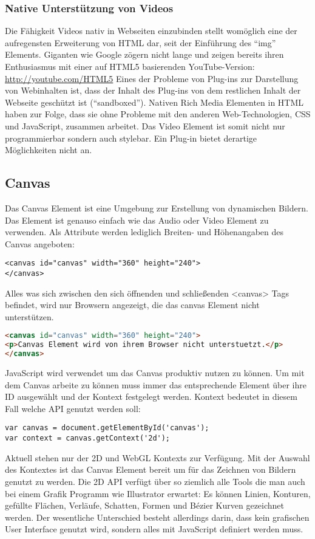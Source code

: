 \subsubsection{Native Unterstützung von Videos}
Die Fähigkeit Videos nativ in Webseiten einzubinden stellt womöglich eine der aufregensten Erweiterung
von HTML dar, seit der Einführung des ``img'' Elements. Giganten wie Google zögern nicht lange und
zeigen bereits ihren Enthusiasmus mit einer auf HTML5 basierenden YouTube-Version:
\url{http://youtube.com/HTML5}
Eines der Probleme von Plug-ins zur Darstellung von Webinhalten ist, dass der Inhalt des Plug-ins
von dem restlichen Inhalt der Webseite geschützt ist (``sandboxed''). Nativen Rich Media Elementen
in HTML haben zur Folge, dass sie ohne Probleme mit den anderen Web-Technologien,
CSS und JavaScript, zusammen arbeitet.
\newline\newline
Das Video Element ist somit nicht nur programmierbar sondern auch stylebar.
Ein Plug-in bietet derartige Möglichkeiten nicht an.

\subsection{Canvas}

Das Canvas Element ist eine Umgebung zur Erstellung von dynamischen Bildern.
Das Element ist genauso einfach wie das Audio oder Video Element zu verwenden.
Als Attribute werden lediglich Breiten- und Höhenangaben des Canvas angeboten:
\begin{verbatim}
<canvas id="canvas" width="360" height="240">
</canvas>
\end{verbatim}
Alles was sich zwischen den sich öffnenden und schließenden <canvas> Tags
befindet, wird nur Browsern angezeigt, die das canvas Element nicht
unterstützen.
\begin{lstlisting}[language=html]
<canvas id="canvas" width="360" height="240">
<p>Canvas Element wird von ihrem Browser nicht unterstuetzt.</p>
</canvas>
\end{lstlisting}

JavaScript wird verwendet um das Canvas produktiv nutzen zu können.
Um mit dem Canvas arbeite zu können muss immer das entsprechende
Element über ihre ID ausgewählt und der Kontext festgelegt werden.
Kontext bedeutet in diesem Fall welche API genutzt werden soll:
\begin{verbatim}
var canvas = document.getElementById('canvas');
var context = canvas.getContext('2d');
\end{verbatim}
Aktuell stehen nur der 2D und WebGL Kontexts zur Verfügung.
Mit der Auswahl des Kontextes ist das Canvas Element bereit
um für das Zeichnen von Bildern genutzt zu werden.
Die 2D API verfügt über so ziemlich alle Tools die man auch bei einem
Grafik Programm wie Illustrator erwartet: Es können Linien, Konturen, gefüllte
Flächen, Verläufe, Schatten, Formen und Bézier Kurven gezeichnet werden.
Der wesentliche Unterschied besteht allerdings darin, dass kein
grafischen User Interface genutzt wird, sondern alles mit JavaScript
definiert werden muss.

